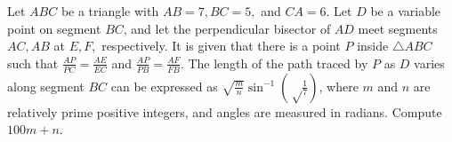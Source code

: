Let $ABC$ be a triangle with $AB = 7, BC = 5,$ and $CA = 6$. Let $D$ be a variable point on segment $BC$, and let the perpendicular bisector of $AD$ meet segments $AC, AB$ at $E, F,$ respectively. It is given that there is a point $P$ inside $\triangle ABC$ such that $\frac{AP}{PC} = \frac{AE}{EC}$ and $\frac{AP}{PB} = \frac{AF}{FB}$. The length of the path traced by $P$ as $D$ varies along segment $BC$ can be expressed as $\sqrt{\frac{m}{n}}\sin^{-1}\left(\sqrt \frac 17\right)$, where $m$ and $n$ are relatively prime positive integers, and angles are measured in radians. Compute $100m + n$.
